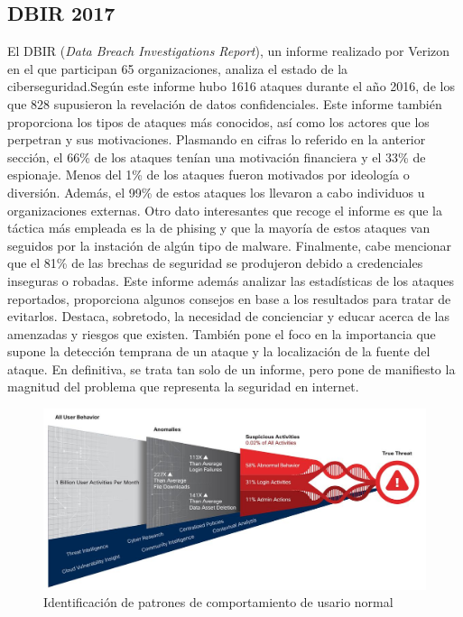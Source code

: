 \subsection{DBIR 2017}
El DBIR (\textit{Data Breach Investigations Report}), un informe realizado por Verizon en el que participan 65 organizaciones, analiza el estado de la ciberseguridad.Según este informe hubo 1616 ataques durante el año 2016, de los que 828 supusieron la revelación de datos confidenciales. Este informe también proporciona los tipos de ataques más conocidos, así como los actores que los perpetran y sus motivaciones. Plasmando en cifras lo referido en la anterior sección, el 66\% de los ataques tenían una motivación financiera y el 33\% de espionaje. Menos del 1\% de los ataques fueron motivados por ideología o diversión. Además, el 99\% de estos ataques los llevaron a cabo individuos u organizaciones externas. Otro dato interesantes que recoge el informe es que la táctica más empleada es la de phising y que la mayoría de estos ataques van seguidos por la instación de algún tipo de malware. Finalmente, cabe mencionar que el 81\% de las brechas de seguridad se produjeron debido a credenciales inseguras o robadas. Este informe además analizar las estadísticas de los ataques reportados, proporciona algunos consejos en base a los resultados para tratar de evitarlos. Destaca, sobretodo, la necesidad de concienciar y educar acerca de las amenzadas y riesgos que existen. También pone el foco en la importancia que supone la detección temprana de un ataque y la localización de la fuente del ataque\cite{DBIR2017}. En definitiva, se trata tan solo de un informe, pero pone de manifiesto la magnitud del problema que representa la seguridad en internet.
\begin{figure}[!b]
\centering
\includegraphics[width=1\textwidth]{images/userBehavior.png}
\caption{Identificación de patrones de comportamiento de usario normal}
\label{fig:behavior}
\end{figure}

